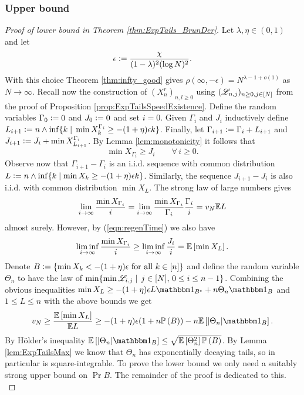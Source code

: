 \subsubsection{Upper bound}
\begin{proof}[Proof of lower bound in Theorem \ref{thm:ExpTails_BrunDer}]

Let $\lambda, \eta \in (0,1)$ and let 
\begin{equation}\nonumber
\epsilon \vcentcolon= \frac{\chi}{(1-\lambda)^2(\log N)^2}. 
\end{equation}
With this choice Theorem \ref{thm:infty_good} gives $\rho(\infty, - \epsilon) = N^{\lambda - 1 + o(1)}$ as $N \to \infty$. Recall now the construction of $(X^r_n)_{n, l \geq 0}$ using $(\mathscr{L}_{n, j})_{n \geq 0, j \in [N]}$ from the proof of Proposition \ref{prop:ExpTailsSpeedExistence}. Define the random variables $\Gamma_0 \vcentcolon= 0$ and $J_0 \vcentcolon= 0$ and set $i = 0$. Given $\Gamma_i$ and $J_i$ inductively define $L_{i+1} \vcentcolon= n \land \inf\{ k \mid\, \min X^{\Gamma_i}_k \geq -(1+\eta)\epsilon k\}$. Finally, let $\Gamma_{i+1} \vcentcolon= \Gamma_i + L_{i+1}$ and $J_{i+1} \vcentcolon= J_i + \min X^{\Gamma_i}_{L_{i+1}}$. By Lemma \ref{lem:monotonicity} it follows that 
\begin{equation}\label{eqn:regenTime}
\min X_{\Gamma_i} \geq J_i \qquad\forall\, i \geq 0. 
\end{equation}
Observe now that $\Gamma_{i+1} - \Gamma_i$ is an i.i.d. sequence with common distribution $L \vcentcolon= n \land \inf \{ k \mid \min X_k \geq - (1+\eta)\epsilon k\}$. Similarly, the sequence $J_{i+1} - J_i$ is also i.i.d. with common distribution $\min X_L$. The strong law of large numbers gives 
\begin{equation}
\lim\limits_{i \to \infty} \frac{\min X_{\Gamma_i}}{i} = \lim\limits_{i \to \infty} \frac{\min X_{\Gamma_i}}{\Gamma_i} \frac{\Gamma_i}{i} = v_N \mathbb{E} L
\end{equation}
almost surely. However, by (\ref{eqn:regenTime}) we also have
\begin{equation}
\liminf\limits_{i \to \infty} \frac{\min X_{\Gamma_i}}{i} \geq \liminf\limits_{i \to \infty} \frac{J_i}{i} = \mathbb{E}\left[ \min X_L \right].
\end{equation}
Denote $B \vcentcolon= \{ \min X_k < - (1+\eta)\epsilon \text{ for all } k \in [n]\}$ and define the random variable $\Theta_n$ to have the law of $\min \{\min \mathscr{L}_{i, j} \mid\, j \in [N],\, 0 \leq i \leq n - 1 \}$. Combining the obvious inequalities $\min X_L \geq -(1 + \eta)\epsilon L \Ind_{B^c} + n \Theta_n \Ind_B$ and $1 \leq L \leq n$ with the above bounds we get
\begin{equation}\label{eqn:lowerBdd}
v_N \geq \frac{\Ex{\min X_L}}{\E L} \geq -(1+\eta)\epsilon (1 + n\Pr{B}) - n\Ex{|\Theta_n| \Ind_B}. 
\end{equation}
By Hölder's inequality $\Ex{|\Theta_n| \Ind_B} \leq \sqrt{\Ex{\Theta_n^2}\Pr{B}}$. By Lemma \ref{lem:ExpTailsMax} we know that $\Theta_n$ has exponentially decaying tails, so in particular is square-integrable. To prove the lower bound we only need a suitably strong upper bound on $\Pr{B}$. The remainder of the proof is dedicated to this. \\


\end{proof}
